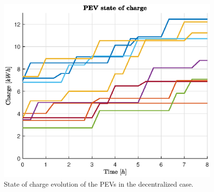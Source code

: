 \begin{figure}[H]
    \centering
    \includegraphics[width=\columnwidth]{figures/images/dec_state.eps}
    \caption{State of charge evolution of the PEVs in the decentralized case.}
    \label{fig:dec_state}
\end{figure}
